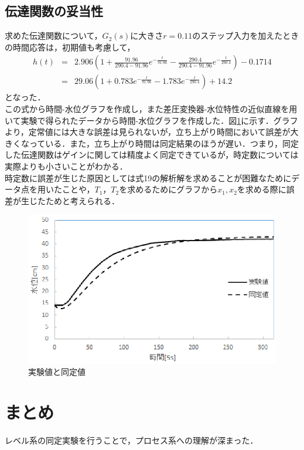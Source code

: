 \documentclass[11pt,a4paper]{jsarticle}
\begin{document}
  \subsection{伝達関数の妥当性}
  求めた伝達関数について，$G_2(s)$に大きさ$r=0.11$のステップ入力を加えたときの時間応答は，初期値も考慮して，
\begin{eqnarray*}
 h(t) & = & 2.906(1+\frac{91.96}{290.4 - 91.96} e^{-\frac{t}{91.96}} - \frac{290.4}{290.4 - 91.96} e^{-\frac{t}{290.4}}) - 0.1714 \\
 & = & 29.06(1+0.783e^{-\frac{t}{91.96}} - 1.783 e^{-\frac{t}{290.4}}) + 14.2
\end{eqnarray*}
となった．\\
この式から時間-水位グラフを作成し，また差圧変換器-水位特性の近似直線を用いて実験で得られたデータから時間-水位グラフを作成した．図\ref{fig13}に示す．グラフより，定常値には大きな誤差は見られないが，立ち上がり時間において誤差が大きくなっている．また，立ち上がり時間は同定結果のほうが遅い．つまり，同定した伝達関数はゲインに関しては精度よく同定できているが，時定数については実際よりも小さいことがわかる． \\
時定数に誤差が生じた原因としては式19の解析解を求めることが困難なためにデータ点を用いたことや，$T_1，T_2$を求めるためにグラフから$x_1,x_2$を求める際に誤差が生じたためと考えられる．

\newpage
\pagestyle{fancy}
\renewcommand{\headrulewidth}{0.0pt}
\cfoot{}


\begin{figure}[H]
 \begin{center}
  \includegraphics[scale=1]{./picture/e6_6.eps}
  \caption{実験値と同定値}
  \label{fig13} 
 \end{center}
\end{figure}



\section{まとめ}
レベル系の同定実験を行うことで，プロセス系への理解が深まった．


\newpage
\pagestyle{fancy}
\renewcommand{\thepage}{$付録$}
\renewcommand{\headrulewidth}{0.0pt}
\rhead{\thepage}
\lhead{}
\cfoot{}


\end{document}
